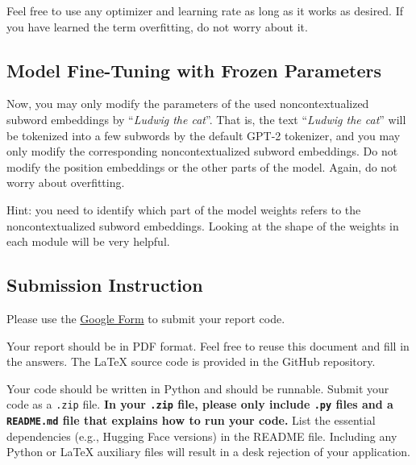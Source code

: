 \documentclass[12pt, letterpaper]{article}
\begin{document}
Feel free to use any optimizer and learning rate as long as it works as desired.
If you have learned the term overfitting, do not worry about it.

\subsection{Model Fine-Tuning with Frozen Parameters}
Now, you may only modify the parameters of the used noncontextualized subword embeddings by ``\textit{Ludwig the cat}''.
That is, the text ``\textit{Ludwig the cat}'' will be tokenized into a few subwords by the default GPT-2 tokenizer, and you may only modify the corresponding noncontextualized subword embeddings.
Do not modify the position embeddings or the other parts of the model.
Again, do not worry about overfitting.

Hint: you need to identify which part of the model weights refers to the noncontextualized subword embeddings.
Looking at the shape of the weights in each module will be very helpful.



\subsection*{Submission Instruction}
Please use the \href{https://forms.gle/Aj8ZS8mP6veCq3267}{Google Form} to submit your report code.

Your report should be in PDF format.
Feel free to reuse this document and fill in the answers.
The \LaTeX\xspace source code is provided in the GitHub repository.

Your code should be written in Python and should be runnable.
Submit your code as a \texttt{.zip} file.
\textbf{In your \texttt{.zip} file, please only include \texttt{.py} files and a \texttt{README.md} file that explains how to run your code.}
List the essential dependencies (e.g., Hugging Face versions) in the README file.
Including any Python or \LaTeX\xspace auxiliary files will result in a desk rejection of your application.




\end{document}
